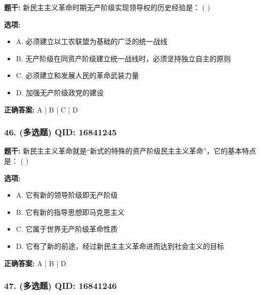 \documentclass[12pt,UTF8]{ctexart}
\begin{document}
\textbf{题干:}
新民主主义革命时期无产阶级实现领导权的历史经验是： ( )

\textbf{选项:}
\begin{itemize}[leftmargin=*]

  \item A. 必须建立以工农联盟为基础的广泛的统一战线

  \item B. 无产阶级在同资产阶级建立统一战线时，必须坚持独立自主的原则

  \item C. 必须建立和发展人民的革命武装力量

  \item D. 加强无产阶级政党的建设

\end{itemize}

\textbf{正确答案:}
A | B | C | D

\vspace{0.3em}\hrulefill\vspace{0.7em}

\subsubsection*{46. (多选题) \small QID: 16841245}

\textbf{题干:}
新民主主义革命就是“新式的特殊的资产阶级民主主义革命”，它的基本特点是： ( )

\textbf{选项:}
\begin{itemize}[leftmargin=*]

  \item A. 它有新的领导阶级即无产阶级

  \item B. 它有新的指导思想即马克恩主义

  \item C. 它属于世界无产阶级革命性质

  \item D. 它有了新的前途，经过新民主主义革命进而达到社会主义的目标

\end{itemize}

\textbf{正确答案:}
A | B | D

\vspace{0.3em}\hrulefill\vspace{0.7em}

\subsubsection*{47. (多选题) \small QID: 16841246}
\end{document}
